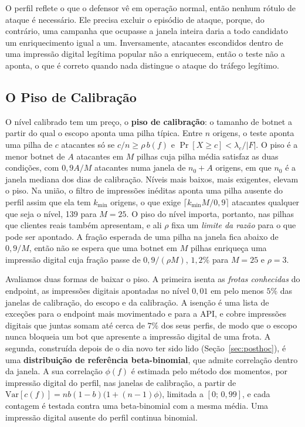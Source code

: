 \documentclass[conference,letterpaper,10pt]{IEEEtran}
\newcommand\1{\textit{(i)}}
\newcommand\2{\textit{(ii)}}
\newcommand\3{\textit{(iii)}}
\begin{document}
O perfil reflete o que o defensor vê em operação normal, então nenhum rótulo de ataque é necessário. Ele precisa excluir o episódio de ataque, porque, do contrário, uma campanha que ocupasse a janela inteira daria a todo candidato um enriquecimento igual a um. Inversamente, atacantes escondidos dentro de uma impressão digital legítima popular não a enriquecem, então o teste não a aponta, o que é correto quando nada distingue o ataque do tráfego legítimo.

\subsection{O Piso de Calibração}
\label{sec:floor}

O nível calibrado tem um preço, o \textbf{piso de calibração}: o tamanho de botnet a partir do qual o escopo aponta uma pilha típica. Entre $n$ origens, o teste aponta uma pilha de $c$ atacantes só se $c/n \geq \rho\, b(f)$ e $\Pr[X \geq c] < \lambda_e/|F|$. O piso é a menor botnet de $A$ atacantes em $M$ pilhas cuja pilha média satisfaz as duas condições, com $0{,}9A/M$ atacantes numa janela de $n_0 + A$ origens, em que $n_0$ é a janela mediana dos dias de calibração. Níveis mais baixos, mais exigentes, elevam o piso. Na união, o filtro de impressões inéditas aponta uma pilha ausente do perfil assim que ela tem $k_{\min}$ origens, o que exige $\lceil k_{\min} M/0{,}9 \rceil$ atacantes qualquer que seja o nível, 139 para $M = 25$. O piso do nível importa, portanto, nas pilhas que clientes reais também apresentam, e ali $\rho$ fixa um \textit{limite da razão} para o que pode ser apontado. A fração esperada de uma pilha na janela fica abaixo de $0{,}9/M$, então não se espera que uma botnet em $M$ pilhas enriqueça uma impressão digital cuja fração passe de $0{,}9/(\rho M)$, $1{,}2\%$ para $M = 25$ e $\rho = 3$.

Avaliamos duas formas de baixar o piso. A primeira isenta as \textit{frotas conhecidas} do endpoint, as impressões digitais apontadas no nível $0{,}01$ em pelo menos $5\%$ das janelas de calibração, do escopo e da calibração. A isenção é uma lista de exceções para o endpoint mais movimentado e para a API, e cobre impressões digitais que juntas somam até cerca de $7\%$ dos seus perfis, de modo que o escopo nunca bloqueia um bot que apresente a impressão digital de uma frota. A segunda, construída depois de o dia novo ter sido lido (Seção~\ref{sec:posthoc}), é uma \textbf{distribuição de referência beta-binomial}, que admite correlação dentro da janela. A sua correlação $\phi(f)$ é estimada pelo método dos momentos, por impressão digital do perfil, nas janelas de calibração, a partir de $\mathrm{Var}[c(f)] = n b(1-b)\bigl(1 + (n-1)\phi\bigr)$, limitada a $[0;\, 0{,}99]$, e cada contagem é testada contra uma beta-binomial com a mesma média. Uma impressão digital ausente do perfil continua binomial.
\end{document}
